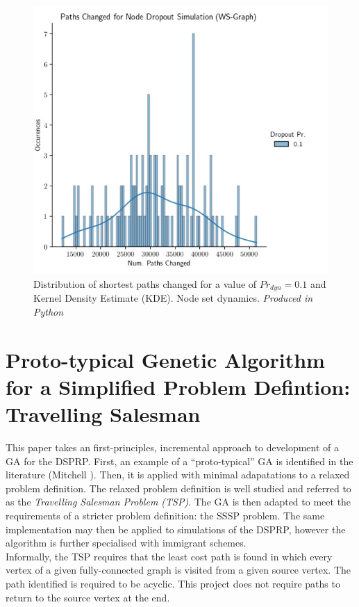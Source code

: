\documentclass[
	a4paper, %
	10pt, %
	unnumberedsections, %
	twoside, %
]{LTJournalArticle}
\begin{document}
\begin{figure}[H]
	\includegraphics[width=\linewidth]{Figures/nsd/paths_dist.jpg}
	\caption{Distribution of shortest paths changed for a value of \(Pr_{dyn} = 0.1\) and Kernel Density Estimate (KDE). Node set dynamics. \emph{Produced in Python}}
	\label{fig:nsd_dist}
\end{figure}

\section{Proto-typical Genetic Algorithm for a Simplified Problem Defintion: Travelling Salesman} 

This paper takes an first-principles, incremental approach to development of a GA for the DSPRP. First, an example of a ``proto-typical'' GA is identified in the literature (Mitchell \cite{mitchell:97}). Then, it is applied with minimal adapatations to a relaxed problem definition. The relaxed problem definition is well studied and referred to as the \emph{Travelling Salesman Problem (TSP)}. The GA is then adapted to meet the requirements of a stricter problem definition: the SSSP problem. The same implementation may then be applied to simulations of the DSPRP, however the algorithm is further specialised with immigrant schemes.  \\

Informally, the TSP requires that the least cost path is found in which every vertex of a given fully-connected graph is visited from a given source vertex. The path identified is required to be acyclic. This project does not require paths to return to the source vertex at the end. \\
\end{document}
